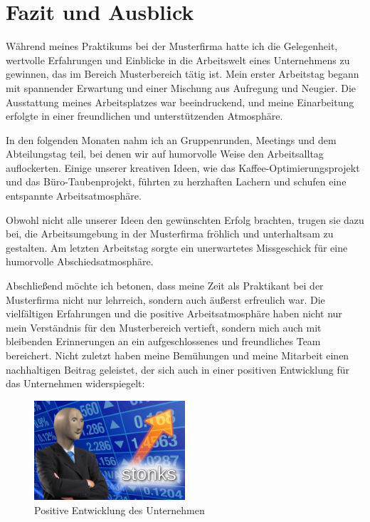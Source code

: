 %
%

\section{Fazit und Ausblick}

Während meines Praktikums bei der Musterfirma hatte ich die Gelegenheit, wertvolle Erfahrungen und Einblicke in die Arbeitswelt eines Unternehmens zu gewinnen, das im Bereich Musterbereich tätig ist. Mein erster Arbeitstag begann mit spannender Erwartung und einer Mischung aus Aufregung und Neugier. Die Ausstattung meines Arbeitsplatzes war beeindruckend, und meine Einarbeitung erfolgte in einer freundlichen und unterstützenden Atmosphäre.

In den folgenden Monaten nahm ich an Gruppenrunden, Meetings und dem Ab\-teilungs\-tag teil, bei denen wir auf humorvolle Weise den Arbeitsalltag auflockerten. Einige unserer kreativen Ideen, wie das Kaffee-Optimierungsprojekt und das Büro-Tauben\-projekt, führten zu herzhaften Lachern und schufen eine entspannte Arbeitsatmosphäre.

Obwohl nicht alle unserer Ideen den gewünschten Erfolg brachten, trugen sie dazu bei, die Arbeitsumgebung in der Musterfirma fröhlich und unterhaltsam zu gestalten. Am letzten Arbeitstag sorgte ein unerwartetes Missgeschick für eine humorvolle Abschiedsatmosphäre.

Abschließend möchte ich betonen, dass meine Zeit als Praktikant bei der Musterfirma nicht nur lehrreich, sondern auch äußerst erfreulich war. Die vielfältigen Erfahrungen und die positive Arbeitsatmosphäre haben nicht nur mein Verständnis für den Musterbereich vertieft, sondern mich auch mit bleibenden Erinnerungen an ein aufgeschlossenes und freundliches Team bereichert. Nicht zuletzt haben meine Bemühungen und meine Mitarbeit einen nachhaltigen Beitrag geleistet, der sich auch in einer positiven Entwicklung für das Unternehmen widerspiegelt:

\begin{figure}[h]
  \centering
  \includegraphics[width=0.5\textwidth]{Bilder/Beispiel Bilder/stonks.png}
  \caption{Positive Entwicklung des Unternehmen}
  \label{fig:stonks}
\end{figure}

